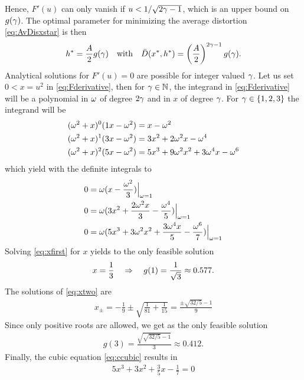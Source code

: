 \documentclass[12pt,onecolumn,journal,draftclsnofoot,letterpaper]{IEEEtran}
\newcommand{\Dis}{\ensuremath{D}}                    %
\newcommand{\AvDis}{\ensuremath{\bar{\Dis}}}         %
\begin{document}
  Hence, $F'(u)$ can only vanish if $u<1/\sqrt{2\gamma-1}$, which is an upper bound on $g(\gamma)$.
  The optimal parameter for minimizing the average distortion  \eqref{eq:AvDisxstar} is then 
  \begin{align}
    h^*= \frac{A}{2} g(\gam) \quad\text{with}\quad \AvDis(x^*,h^*)= \left(\frac{A}{2}\right)^{2\gam-1} g(\gam).
  \end{align}
  Analytical solutions for $F'(u)=0$ are possible for integer valued $\gamma$.  Let us set $0<x=u^2$ in
  \eqref{eq:Fderivative}, then for $\gamma\in{\ensuremath{\mathbb N}}$, the integrand in \eqref{eq:Fderivative} will be a polynomial in $\omega$
  of degree $2\gamma$ and in $x$ of degree $\gamma$. For $\gamma\in\{1,2,3\}$ the integrand will be 
%
\begin{align}
  (\omega^2+x)^0 (1x-\omega^2)&=x-\omega^2\\
  (\omega^2+x)^1 (3x-\omega^2)&=3x^2+2\omega^2x -\omega^4 \\
  (\omega^2+x)^2 (5x-\omega^2)&=5x^3 +9\omega^2 x^2 +3\omega^4 x -\omega^6
\end{align}
%
which yield with the definite integrals to
%
\begin{align}
  0 &= \omega(x-\frac{\omega^2}{3})\Big|_{\omega=1}\label{eq:xfirst}\\
  0 &= \omega( 3x^2 +\frac{2\omega^2x}{3} -\frac{\omega^4}{5}  )\Big|_{\omega=1}\label{eq:xtwo}\\ 
  0 &= \omega( 5x^3 + 3\omega^2x^2 +\frac{3\omega^4x}{5}  -\frac{\omega^6}{7}  )\Big|_{\omega=1}\label{eq:ccubic} 
\end{align}
%
Solving \eqref{eq:xfirst} for $x$  yields to the only feasible solution
%
\begin{align}
  x=\frac{1}{3} \quad\Rightarrow\quad g(1)=\frac{1}{\sqrt{3}}\approx 0.577.
\end{align}
%
The solutions of \eqref{eq:xtwo} are 
%
\begin{align}
  x_{\pm}= -\frac{1}{9} \pm \sqrt{\frac{1}{81}+\frac{1}{15}} = \frac{\pm \sqrt{32/5} -1}{9}
\end{align}
%
Since only positive roots are allowed, we get as the only feasible solution
%
\begin{align}
  g(3)=\frac{\sqrt{\sqrt{32/5}-1}}{3}\approx 0.412.
\end{align}
%
Finally, the cubic equation \eqref{eq:ccubic} results in
%
\begin{align}
  5x^3 + 3 x^2 + \frac{3}{5} x - \frac{1}{7}=0
\end{align}
\end{document}
